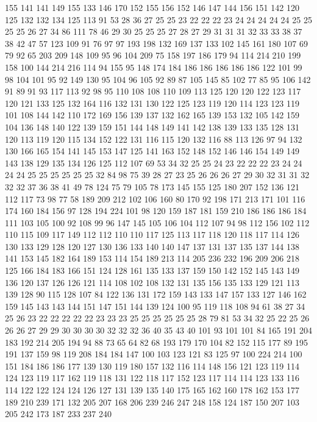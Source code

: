 155 141 141 149 155 133 146 170 152 155 156 152 146 147 144 156 151 142 120 125
132 132 134 125 113 91 53 28 36 27 25 25 23 22 22 22 23 24 24 24
24 24 25 25 25 25 26 27 34 86 111 78 46 29 30 25 25 25 27 28
27 29 31 31 31 32 33 33 38 37 38 42 47 57 123 109 91 76 97 97
193 198 132 169 137 133 102 145 161 180 107 69 79 92 65 203 209 148 109 95
96 104 209 75 158 197 186 179 94 114 214 210 199 158 100 144 214 216 114 94
155 95 148 174 184 186 186 186 186 186 122 101 99 98 104 101 95 92 149 130
95 104 96 105 92 89 87 105 145 85 102 77 85 95 106 142 91 89 91 93
117 113 92 98 95 110 108 108 110 109 113 125 120 120 122 123 117 120 121 133
125 132 164 116 132 131 130 122 125 123 119 120 114 123 123 119 101 108 144 142
110 172 169 156 139 137 132 162 165 139 153 132 105 142 159 104 136 148 140 122
139 159 151 144 148 149 141 142 138 139 133 135 128 131 120 113 119 120 115 134
152 122 131 116 115 120 132 116 88 113 126 97 94 132 130 166 165 154 141 145
153 147 125 141 163 152 148 152 146 146 154 149 149 143 138 129 135 134 126 125
112 107 69 53 34 32 25 25 24 23 22 22 22 23 24 24 24 24 25 25
25 25 25 25 32 84 98 75 39 28 27 23 25 26 26 26 27 29 30 32
31 31 32 32 32 37 36 38 41 49 78 124 75 79 105 78 173 145 155 125
180 207 152 136 121 112 117 73 98 77 58 189 209 212 102 106 160 80 170 92
198 171 213 171 101 116 174 160 184 156 97 128 194 224 101 98 120 159 187 181
159 210 186 186 186 184 111 103 105 100 92 108 99 96 147 145 105 106 104 112
107 94 98 112 156 102 112 110 115 109 117 149 112 112 110 110 117 125 113 117
118 120 118 117 114 126 130 133 129 128 120 127 130 136 133 140 140 147 137 131
137 135 137 144 138 141 153 145 182 164 189 153 114 154 189 213 114 205 236 232
196 209 206 218 125 166 184 183 166 151 124 128 161 135 133 137 159 150 142 152
145 143 149 136 120 137 126 126 121 114 108 102 108 132 131 135 156 135 133 129
121 113 139 128 90 115 128 107 84 122 136 131 172 159 143 133 147 157 133 127
146 162 159 145 143 143 144 151 147 151 144 139 124 100 95 119 118 108 94 61
38 27 34 25 26 23 22 22 22 22 22 23 23 23 25 25 25 25 25 25
28 79 81 53 34 32 25 22 25 26 26 26 27 29 29 30 30 30 30 32
32 32 36 40 35 43 40 101 93 101 101 84 165 191 204 183 192 214 205 194
94 88 73 65 64 82 68 193 179 170 104 82 152 115 177 89 195 191 137 159
98 119 208 184 184 147 100 103 123 121 83 125 97 100 224 214 100 151 184 186
186 177 139 130 119 180 157 132 116 114 148 156 121 123 119 114 124 123 119 117
162 119 118 131 122 118 117 152 123 117 114 114 123 133 116 114 122 122 124 124
126 127 131 139 135 140 175 165 162 160 178 162 153 177 189 210 239 171 132 205
207 168 206 239 246 247 248 158 124 187 150 207 103 205 242 173 187 233 237 240

